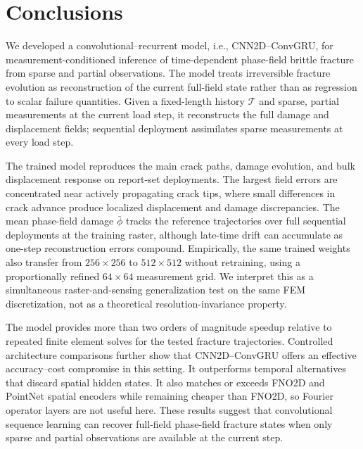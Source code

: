 \documentclass[10pt]{article}
\theoremstyle{definition}
\begin{document}
\section{Conclusions}\label{sec:conclusions}

We developed a convolutional--recurrent model, i.e., CNN2D--ConvGRU, for measurement-conditioned inference of time-dependent phase-field brittle fracture from sparse and partial observations.
%
The model treats irreversible fracture evolution as reconstruction of the current full-field state rather than as regression to scalar failure quantities.
%
Given a fixed-length history $\mathcal{T}$ and sparse, partial measurements at the current load step, it reconstructs the full damage and displacement fields; sequential deployment assimilates sparse measurements at every load step.
%

The trained model reproduces the main crack paths, damage evolution, and bulk displacement response on report-set deployments.
%
The largest field errors are concentrated near actively propagating crack tips, where small differences in crack advance produce localized displacement and damage discrepancies.
%
The mean phase-field damage $\bar{\phi}$ tracks the reference trajectories over full sequential deployments at the training raster, although late-time drift can accumulate as one-step reconstruction errors compound.
%
Empirically, the same trained weights also transfer from $256\times256$ to $512\times512$ without retraining, using a proportionally refined $64\times64$ measurement grid.
%
We interpret this as a simultaneous raster-and-sensing generalization test on the same FEM discretization, not as a theoretical resolution-invariance property.

The model provides more than two orders of magnitude speedup relative to repeated finite element solves for the tested fracture trajectories.
%
Controlled architecture comparisons further show that CNN2D--ConvGRU offers an effective accuracy--cost compromise in this setting.
%
It outperforms temporal alternatives that discard spatial hidden states.
%
It also matches or exceeds FNO2D and PointNet spatial encoders while remaining cheaper than FNO2D, so Fourier operator layers are not useful here.
%
These results suggest that convolutional sequence learning can recover full-field phase-field fracture states when only sparse and partial observations are available at the current step.
\end{document}

